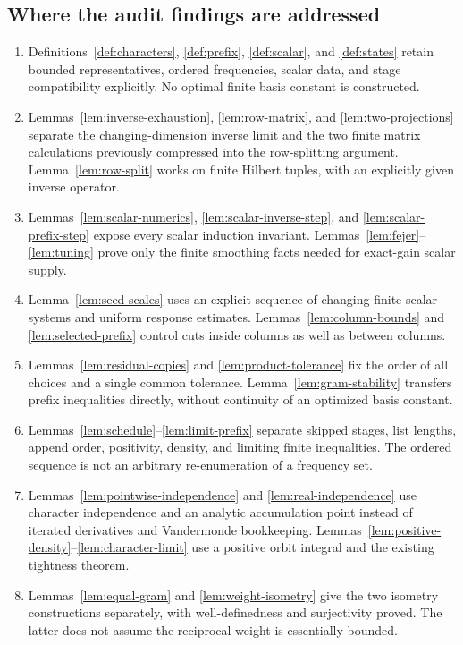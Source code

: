 \documentclass[reqno,a4paper,12pt]{amsart}
\theoremstyle{definition}
\begin{document}
\subsection{Where the audit findings are addressed}
\begin{enumerate}
\item Definitions~\ref{def:characters}, \ref{def:prefix},
\ref{def:scalar}, and \ref{def:states} retain bounded representatives,
ordered frequencies, scalar data, and stage compatibility explicitly.
No optimal finite basis constant is constructed.
\item Lemmas~\ref{lem:inverse-exhaustion}, \ref{lem:row-matrix},
and \ref{lem:two-projections} separate the changing-dimension inverse
limit and the two finite matrix calculations previously compressed
into the row-splitting argument. Lemma~\ref{lem:row-split} works on
finite Hilbert tuples, with an explicitly given inverse operator.
\item Lemmas~\ref{lem:scalar-numerics}, \ref{lem:scalar-inverse-step},
and \ref{lem:scalar-prefix-step} expose every scalar induction
invariant. Lemmas~\ref{lem:fejer}--\ref{lem:tuning} prove only the
finite smoothing facts needed for exact-gain scalar supply.
\item Lemma~\ref{lem:seed-scales} uses an explicit sequence of changing
finite scalar systems and uniform response estimates.
Lemmas~\ref{lem:column-bounds} and \ref{lem:selected-prefix} control
cuts inside columns as well as between columns.
\item Lemmas~\ref{lem:residual-copies} and \ref{lem:product-tolerance}
fix the order of all choices and a single common tolerance.
Lemma~\ref{lem:gram-stability} transfers prefix inequalities directly,
without continuity of an optimized basis constant.
\item Lemmas~\ref{lem:schedule}--\ref{lem:limit-prefix} separate skipped
stages, list lengths, append order, positivity, density, and limiting
finite inequalities. The ordered sequence is not an arbitrary
re-enumeration of a frequency set.
\item Lemmas~\ref{lem:pointwise-independence} and
\ref{lem:real-independence} use character independence and an analytic
accumulation point instead of iterated derivatives and Vandermonde
bookkeeping. Lemmas~\ref{lem:positive-density}--\ref{lem:character-limit}
use a positive orbit integral and the existing tightness theorem.
\item Lemmas~\ref{lem:equal-gram} and \ref{lem:weight-isometry} give the
two isometry constructions separately, with well-definedness and
surjectivity proved. The latter does not assume the reciprocal weight
is essentially bounded.
\end{enumerate}
\end{document}
